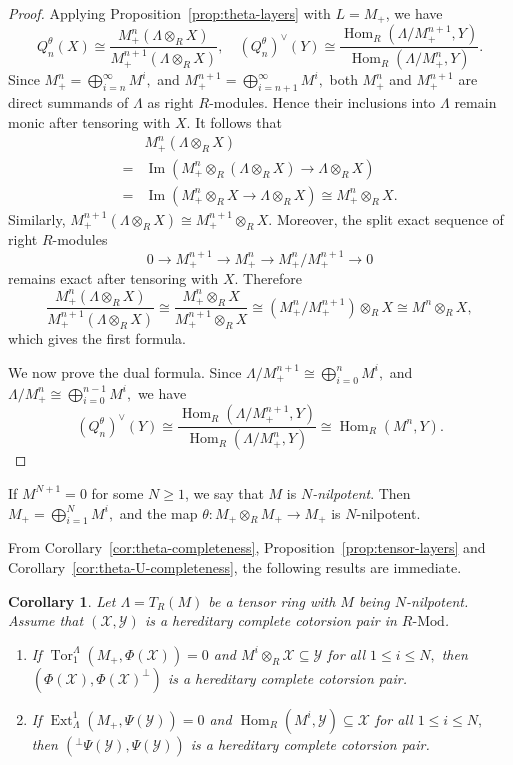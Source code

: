 \documentclass[11pt,reqno]{amsart}
\numberwithin{equation}{section}
\newtheorem{corollary}[theorem]{Corollary}
\newcommand{\cX}{\mathcal X}
\newcommand{\cY}{\mathcal Y}
\newcommand{\Ext}{\operatorname{Ext}}
\newcommand{\Hom}{\operatorname{Hom}}
\newcommand{\Tor}{\operatorname{Tor}}
\newcommand{\Ima}{\operatorname{Im}}
\begin{document}
\begin{proof}
Applying Proposition~\ref{prop:theta-layers} with $L=M_+$, we have
\[
Q_n^\theta(X)\cong\frac{M_+^n(\Lambda\otimes_RX)}{M_+^{n+1}(\Lambda\otimes_RX)},\quad (Q_n^\theta)^\vee(Y)
\cong
\frac{\Hom_R(\Lambda/M_+^{n+1},Y)}
     {\Hom_R(\Lambda/M_+^n,Y)}.
\]
Since
$
M_+^n=\bigoplus_{i=n}^\infty M^i,
$
and
$
M_+^{n+1}=\bigoplus_{i=n+1}^\infty M^i,
$
both $M_+^n$ and $M_+^{n+1}$ are direct summands of $\Lambda$ as right $R$-modules. Hence their inclusions into $\Lambda$ remain monic after tensoring with $X$. It follows that
\begin{align*}
&M_+^n(\Lambda\otimes_RX)\\
=&\Ima(M_+^n\otimes_R(\Lambda\otimes_RX)\to \Lambda\otimes_RX)\\
=&\Ima(M_+^n\otimes_RX\to \Lambda\otimes_RX)\cong M_+^n\otimes_RX.
\end{align*}
Similarly,
$
M_+^{n+1}(\Lambda\otimes_RX)\cong M_+^{n+1}\otimes_RX.
$
Moreover, the split exact sequence of right $R$-modules
\[
0\longrightarrow M_+^{n+1}\longrightarrow M_+^n
\longrightarrow M_+^n/M_+^{n+1}\longrightarrow0
\]
remains exact after tensoring with $X$. Therefore
\[
\frac{M_+^n(\Lambda\otimes_RX)}{M_+^{n+1}(\Lambda\otimes_RX)}
\cong
\frac{M_+^n\otimes_RX}{M_+^{n+1}\otimes_RX}
\cong
\left(M_+^n/M_+^{n+1}\right)\otimes_RX
\cong M^n\otimes_RX,
\]
which gives the first formula.

We now prove the dual formula. Since
$
\Lambda/M_+^{n+1}\cong\bigoplus_{i=0}^nM^i,
$
and
$
\Lambda/M_+^n\cong\bigoplus_{i=0}^{n-1}M^i,
$
we have
\[
(Q_n^\theta)^\vee(Y)
\cong
\frac{\Hom_R(\Lambda/M_+^{n+1},Y)}
     {\Hom_R(\Lambda/M_+^n,Y)}
\cong\Hom_R(M^n,Y).
\]
\end{proof}

If
$
M^{N+1}=0
$
for some $N\ge1$, we say that $M$ is \emph{$N$-nilpotent}. Then
$
M_+=\bigoplus_{i=1}^NM^i,
$
and the map $\theta\colon M_+\otimes_RM_+\to M_+$ is $N$-nilpotent.



From Corollary~\ref{cor:theta-completeness}, Proposition~\ref{prop:tensor-layers} and Corollary~\ref{cor:theta-U-completeness}, the following results are immediate.

\begin{corollary}\label{thm:tensor-completeness}
Let $\Lambda = T_R(M)$ be a tensor ring with $M$ being $N$-nilpotent. Assume that $(\cX,\cY)$ is a hereditary complete cotorsion pair in $R\text{-Mod}$.
\begin{enumerate}[label=\textup{(\arabic*)}]
\item If
$
\Tor_1^\Lambda(M_+,\Phi(\cX))=0
$
and
$
M^i\otimes_R\cX\subseteq\cY$ for all $1\le i\le N,$
then $(\Phi(\cX),\Phi(\cX)^\perp)$ is a hereditary complete cotorsion pair.
\item If
$
\Ext_\Lambda^1(M_+,\Psi(\cY))=0
$
and
$
\Hom_R(M^i,\cY)\subseteq\cX$ for all $1\le i\le N,$
then $({}^\perp\Psi(\cY),\Psi(\cY))$ is a hereditary complete cotorsion pair.
\end{enumerate}
\end{corollary}
\end{document}
